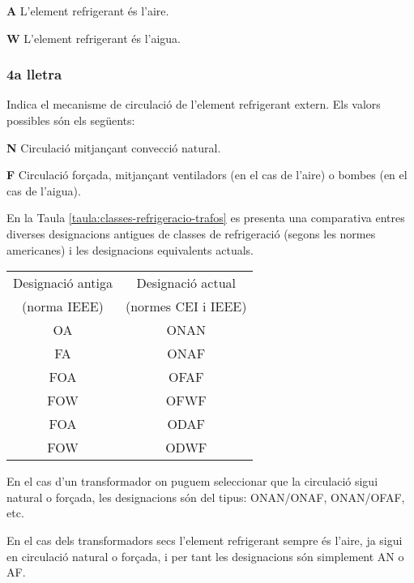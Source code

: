 \begin{list}{}
   {\setlength{\labelwidth}{10mm} \setlength{\leftmargin}{10mm} \setlength{\labelsep}{2mm}}
   \item[\textbf{A}] L'element refrigerant és l'aire.
   \item[\textbf{W}] L'element refrigerant és l'aigua.
\end{list}
 

\subsubsection*{4a lletra}
 Indica el mecanisme de circulació de l'element
refrigerant extern. Els valors possibles són els següents:
\begin{list}{}
   {\setlength{\labelwidth}{10mm} \setlength{\leftmargin}{10mm} \setlength{\labelsep}{2mm}}
   \item[\textbf{N}] Circulació mitjançant convecció natural.
   \item[\textbf{F}] Circulació forçada, mitjançant ventiladors (en el cas de
   l'aire) o bombes (en el cas de l'aigua).
\end{list}
 

En la Taula \vref{taula:classes-refrigeracio-trafos} es presenta una
comparativa entres diverses designacions antigues de classes de
refrigeració (segons les normes americanes) i les designacions
equivalents actuals.

\begin{center}
   \label{taula:classes-refrigeracio-trafos}
   \begin{tabular}{cc}
   \toprule[1pt]
   Designació antiga & Designació actual \\
   (norma IEEE)     & (normes CEI i IEEE) \\
   \midrule
   OA & ONAN   \\
   FA & ONAF   \\
   FOA & OFAF  \\
   FOW & OFWF  \\
   FOA & ODAF  \\
   FOW & ODWF \\
   \bottomrule[1pt]
   \end{tabular}
\end{center}

En el cas d'un transformador on puguem seleccionar que la circulació
sigui natural o forçada,
les designacions són del tipus: ONAN/ONAF, ONAN/OFAF, etc.

En el cas dels transformadors secs l'element refrigerant sempre és
l'aire, ja sigui en circulació natural o forçada, i per tant les
designacions són simplement AN o AF.





